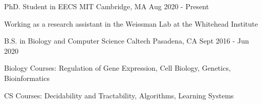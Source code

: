 

\begin{cventries}

  \cventry
    {PhD. Student in EECS} %
    {MIT} %
    {Cambridge, MA} %
    {Aug 2020 - Present} %
    {
      \begin{cvitems} %
        \item {Working as a research assistant in the Weissman Lab at the Whitehead Institute}
      \end{cvitems}
    }
  \cventry
    {B.S. in Biology and Computer Science} %
    {Caltech} %
    {Pasadena, CA} %
    {Sept 2016 - Jun 2020} %
    {
      \begin{cvitems} %
        \item {Biology Courses: Regulation of Gene Expression, Cell Biology, Genetics, Bioinformatics}
        \item {CS Courses: Decidability and Tractability, Algorithms, Learning Systems}
      \end{cvitems}
    }

\end{cventries}
